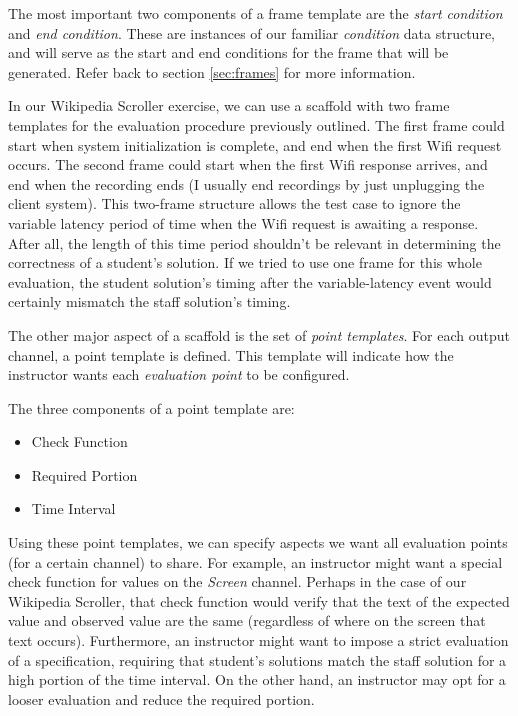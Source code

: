 \documentclass[12pt]{article}
\begin{document}
The most important two components of a frame template are the \textit{start condition} and \textit{end condition}.  These are instances of our familiar \textit{condition} data structure, and will serve as the start and end conditions for the frame that will be generated.  Refer back to section \ref{sec:frames} for more information.

In our Wikipedia Scroller exercise, we can use a scaffold with two frame templates for the evaluation procedure previously outlined.  The first frame could start when system initialization is complete, and end when the first Wifi request occurs.  The second frame could start when the first Wifi response arrives, and end when the recording ends (I usually end recordings by just unplugging the client system).  This two-frame structure allows the test case to ignore the variable latency period of time when the Wifi request is awaiting a response.  After all, the length of this time period shouldn't be relevant in determining the correctness of a student's solution.  If we tried to use one frame for this whole evaluation, the student solution's timing after the variable-latency event would certainly mismatch the staff solution's timing.

The other major aspect of a scaffold is the set of \textit{point templates}.  For each output channel, a point template is defined.  This template will indicate how the instructor wants each \textit{evaluation point} to be configured.

The three components of a point template are:

\begin{itemize}
\item Check Function
\item Required Portion
\item Time Interval
\end{itemize}

Using these point templates, we can specify aspects we want all evaluation points (for a certain channel) to share.  For example, an instructor might want a special check function for values on the \textit{Screen} channel.  Perhaps in the case of our Wikipedia Scroller, that check function would verify that the text of the expected value and observed value are the same (regardless of where on the screen that text occurs).  Furthermore, an instructor might want to impose a strict evaluation of a specification, requiring that student's solutions match the staff solution for a high portion of the time interval.  On the other hand, an instructor may opt for a looser evaluation and reduce the required portion.
\end{document}
